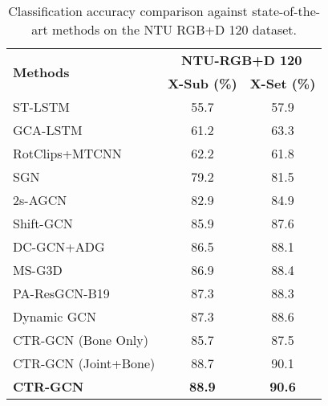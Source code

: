 \documentclass[10pt,twocolumn,letterpaper]{article}
\begin{document}
\begin{table}
	\begin{center}
		\begin{tabular}{l c c}
			\hline
			\multirow{2}{*}{\textbf{Methods}} & \multicolumn{2}{c}{\textbf{NTU-RGB+D 120}}\\
			  & \textbf{X-Sub (\%)} & \textbf{X-Set (\%)} \\
			\hline\hline
			ST-LSTM\cite{liu2016spatio} & 55.7 & 57.9\\
			GCA-LSTM\cite{liu2017skeleton} & 61.2 & 63.3\\
			RotClips+MTCNN\cite{ke2018learning} & 62.2 & 61.8\\
\hline
			SGN\cite{zhang2020semantics} & 79.2 & 81.5\\
			2s-AGCN\cite{shi2019two} & 82.9 & 84.9\\
			Shift-GCN\cite{cheng2020skeleton} & 85.9 & 87.6\\
			DC-GCN+ADG\cite{cheng2020eccv} & 86.5 & 88.1\\
			MS-G3D\cite{liu2020disentangling} & 86.9 & 88.4\\
			PA-ResGCN-B19 \cite{song2020stronger} & 87.3 & 88.3 \\
			Dynamic GCN \cite{ye2020dynamic} & 87.3 & 88.6 \\
			\hline\hline
			CTR-GCN (Bone Only) & 85.7 & 87.5 \\
			CTR-GCN (Joint+Bone) & 88.7 & 90.1 \\
			\textbf{CTR-GCN} & \textbf{88.9} & \textbf{90.6}\\
			\hline
		\end{tabular}
	\end{center}
	\vspace{-0.3cm}
	\caption{Classification accuracy comparison against state-of-the-art methods on the NTU RGB+D 120 dataset.}
	\vspace{-0.5cm}
	\label{tab:ntu120}
\end{table}
\end{document}
